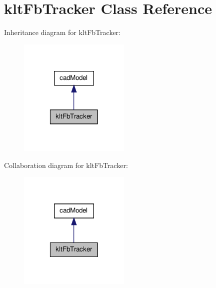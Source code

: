 \hypertarget{classkltFbTracker}{\section{klt\-Fb\-Tracker \-Class \-Reference}
\label{classkltFbTracker}
}


\-Inheritance diagram for klt\-Fb\-Tracker\-:
\nopagebreak
\begin{figure}[H]
\begin{center}
\leavevmode
\includegraphics[width=150pt]{classkltFbTracker__inherit__graph}
\end{center}
\end{figure}


\-Collaboration diagram for klt\-Fb\-Tracker\-:
\nopagebreak
\begin{figure}[H]
\begin{center}
\leavevmode
\includegraphics[width=150pt]{classkltFbTracker__coll__graph}
\end{center}
\end{figure}
